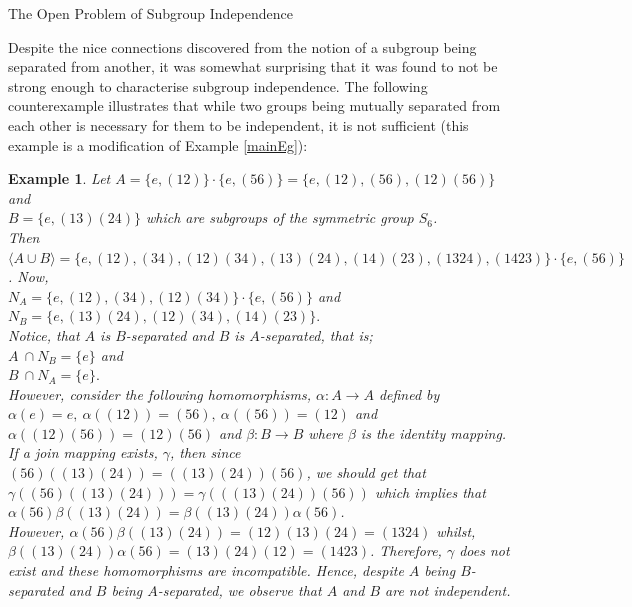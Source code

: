 \documentclass{article}
\newtheorem{example}{Example}[section]
\begin{document}
	\begin{section}{The Open Problem of Subgroup Independence}
		
		
		Despite the nice connections discovered from the notion of a subgroup being separated from another, it was somewhat surprising that  it was found to not be strong enough to characterise subgroup independence. The following counterexample illustrates that while two groups being mutually separated from each other is necessary for them to be independent, it is not sufficient (this example is a modification of Example \ref{mainEg}):
		
		\begin{example}\label{mainEg2}
			\normalfont
			Let $A = \{e, (12)\} \cdot \{e, (56)\} =  \{ e, (1 2), (5 6), (1 2 )(5 6)  \}$ and \\ $B  = \{ e, (1 3) (2 4)\}$ which are subgroups of the symmetric group $S_6$.\\ Then $\langle A \cup B\rangle  = \{ e, (1 2), (3 4) , (1 2)(3 4), (1 3)(2 4), (1 4)(2 3), (1324), (1423)  \} \cdot \{e, (5 6)\}$. Now,\\
			$N_A  = \{e, (12), (34), (12)(34)\} \cdot \{e, (5 6)\}$ and\\
			$N_B  = \{ e, (1 3)(24), (12)(34), (14)(23)\}.$\\ Notice, that $A$ is $B$-separated and $B$ is $A$-separated, that is;\\
			$A \  \cap  N_B  = \{e\}$ and \\
			$B \  \cap N_A  = \{e\}.$\\
			However, consider the following homomorphisms, $\alpha: A \rightarrow A$ defined by $ \alpha(e) = e, \  \alpha((12)) = (56), \ \alpha((56)) = (12)$ and $\alpha((12)(56)) = (12)(56)$ and $\beta: B \rightarrow B$ where $\beta$ is the identity mapping.	If a join mapping exists, $\gamma$, then since $(56)((13)(24)) =  ((13)(24))(56)$, we should get that $\gamma((56)((13)(24))) = \gamma (((13)(24))(56)) $ which implies that $\alpha(56) \beta((13)(24)) = \beta((13)(24))\alpha(56)$.\\
			However,  	$\alpha(56) \beta((13)(24)) = (12)(13)(24)= (1324)$ whilst, $ \beta((13)(24))\alpha(56) = (13)(24)(12) = (1423)$. Therefore, $\gamma$ does not exist and these homomorphisms are incompatible. Hence, despite $A$ being $B$-separated and $B$ being $A$-separated, we observe that $A$ and $B$ are not independent.
		\end{example} 
		

\end{section}
\end{document}
